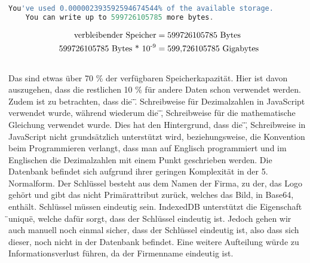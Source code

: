 \newline
\begin{lstlisting}[language=JavaScript,label={lst:JavaScript IndexedDB Speichergröße Ergebnis}]
    You've used 0.000002393592594674544% of the available storage.
    You can write up to 599726105785 more bytes.
\end{lstlisting}
\newline
\newline
\begin{equation}
    \begin{aligned}
       \text{verbleibender Speicher} &= \text{599726105785 Bytes}\\
       \newline
       \text{599726105785 Bytes} \text{ * 10}\textsuperscript{-9} &= \text{599,726105785 Gigabytes}\\
        \newline
        \newline
    \end{aligned}
\end{equation}
\newline
\newline
Das sind etwas über 70 \%\) der verfügbaren Speicherkapazität.
Hier ist davon auszugehen, dass die restlichen 10 \%\) für andere Daten schon verwendet werden.
Zudem ist zu betrachten, dass die \"\).\"\) Schreibweise für Dezimalzahlen in JavaScript verwendet wurde, während wiederum die \"\),\"\) Schreibweise für die mathematische Gleichung verwendet wurde.
Dies hat den Hintergrund, dass die \"\),\"\) Schreibweise in JavaScript nicht grundsätzlich unterstützt wird, beziehungsweise, die Konvention beim Programmieren verlangt, dass man auf Englisch programmiert und im Englischen die Dezimalzahlen mit einem Punkt geschrieben werden.
\newline
\newline
Die Datenbank befindet sich aufgrund ihrer geringen Komplexität in der 5. Normalform.
Der Schlüssel besteht aus dem Namen der Firma, zu der, das Logo gehört und gibt das nicht Primärattribut zurück, welches das Bild, in Base64, enthält.
Schlüssel müssen eindeutig sein.
IndexedDB unterstützt die Eigenschaft \"\)unique\"\), welche dafür sorgt, dass der Schlüssel eindeutig ist.
Jedoch gehen wir auch manuell noch einmal sicher, dass der Schlüssel eindeutig ist, also dass sich dieser, noch nicht in der Datenbank befindet.
Eine weitere Aufteilung würde zu Informationsverlust führen, da der Firmenname eindeutig ist.
\newline

